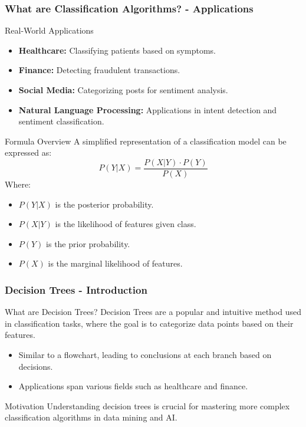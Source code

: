 \documentclass[aspectratio=169]{beamer}
\begin{document}
\begin{frame}[fragile]
    \frametitle{What are Classification Algorithms? - Applications}
    \begin{block}{Real-World Applications}
        \begin{itemize}
            \item \textbf{Healthcare:} Classifying patients based on symptoms.
            \item \textbf{Finance:} Detecting fraudulent transactions.
            \item \textbf{Social Media:} Categorizing posts for sentiment analysis.
            \item \textbf{Natural Language Processing:} Applications in intent detection and sentiment classification.
        \end{itemize}
    \end{block}
    
    \begin{block}{Formula Overview}
        A simplified representation of a classification model can be expressed as:
        \begin{equation}
            P(Y|X) = \frac{P(X|Y) \cdot P(Y)}{P(X)}
        \end{equation}
        Where:
        \begin{itemize}
            \item \( P(Y|X) \) is the posterior probability.
            \item \( P(X|Y) \) is the likelihood of features given class.
            \item \( P(Y) \) is the prior probability.
            \item \( P(X) \) is the marginal likelihood of features.
        \end{itemize}
    \end{block}
\end{frame}

\begin{frame}[fragile]
    \frametitle{Decision Trees - Introduction}
    \begin{block}{What are Decision Trees?}
        Decision Trees are a popular and intuitive method used in classification tasks, where the goal is to categorize data points based on their features.
    \end{block}
    \begin{itemize}
        \item Similar to a flowchart, leading to conclusions at each branch based on decisions.
        \item Applications span various fields such as healthcare and finance.
    \end{itemize}
    \pause
    \begin{block}{Motivation}
        Understanding decision trees is crucial for mastering more complex classification algorithms in data mining and AI.
    \end{block}
\end{frame}
\end{document}
